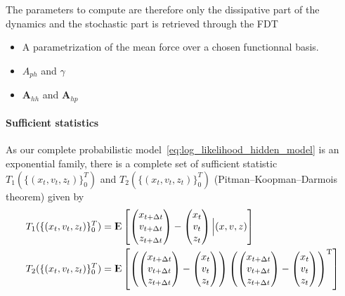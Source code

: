 \documentclass{article}
\numberwithin{equation}{section} %
\newcommand{\expec}[1]{\ensuremath{{\rm I\kern-.3em \rm E}\left[#1\right]}}
\renewcommand{\rm}[1]{\mathrm{#1}}%
\newcommand{\T}{\rm{T}}
\newcommand{\1}{\mathds{1}} %
\begin{document}
The parameters to compute are therefore only the dissipative part of the dynamics and the stochastic part is retrieved through the FDT
\begin{itemize}
    \item A parametrization of the mean force over a chosen functionnal basis.
    \item $A_{ph}$ and $\gamma$
    \item $\bm{A}_{hh}$ and $ \bm{A}_{hp}$
\end{itemize}

\paragraph{Sufficient statistics}
As our complete probabilistic model~\eqref{eq:log_likelihood_hidden_model} is an exponential family, there is a complete set of sufficient statistic $T_1(\{(x_t,v_t,z_t) \}_0^T) $  and $T_2(\{(x_t,v_t,z_t) \}_0^T)$ (Pitman–Koopman–Darmois theorem) given by
\begin{align}
    \label{eq:sufficient_stats}
    T_1(\{(x_t,v_t,z_t) \}_0^T) &=  \expec{\begin{pmatrix}
    x_{t+\Delta t} \\ v_{t+\Delta t} \\ z_{t+\Delta t}
    \end{pmatrix}-\begin{pmatrix}
    x_t \\ v_t \\ z_t
    \end{pmatrix}\Big| (x,v,z)} \\
      T_2(\{(x_t,v_t,z_t) \}_0^T) &=  \expec{\left( \begin{pmatrix}
    x_{t+\Delta t} \\ v_{t+\Delta t} \\ z_{t+\Delta t}
    \end{pmatrix}-\begin{pmatrix}
    x_t \\ v_t \\ z_t
    \end{pmatrix}\right) \left( \begin{pmatrix}
    x_{t+\Delta t} \\ v_{t+\Delta t} \\ z_{t+\Delta t}
    \end{pmatrix}-\begin{pmatrix}
    x_t \\ v_t \\ z_t
    \end{pmatrix}\right)^\T}  
\end{align}
\end{document}
